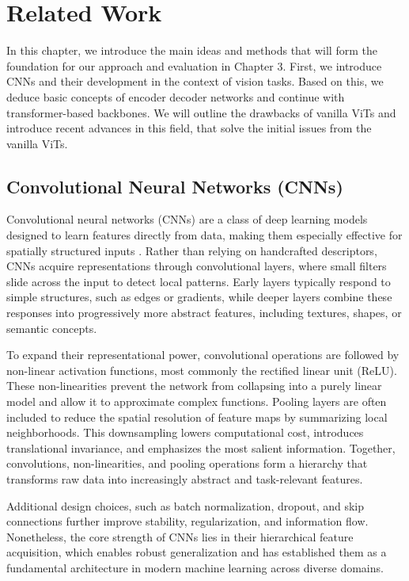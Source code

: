 \chapter{Related Work} 
\label{State of the art}

In this chapter, we introduce the main ideas and methods that will form the foundation for our approach and evaluation in Chapter 3.
First, we introduce CNNs and their development in the context of vision tasks. Based on this, we deduce basic concepts of encoder decoder networks and continue with transformer-based backbones. We will outline the drawbacks of vanilla ViTs and introduce recent advances in this field, that solve the initial issues from the vanilla ViTs. 


\section{Convolutional Neural Networks (CNNs)}

Convolutional neural networks (CNNs) are a class of deep learning models designed to learn features directly from data, making them especially effective for spatially structured inputs \cite{LeCun.1989}. Rather than relying on handcrafted descriptors, CNNs acquire representations through convolutional layers, where small filters slide across the input to detect local patterns. Early layers typically respond to simple structures, such as edges or gradients, while deeper layers combine these responses into progressively more abstract features, including textures, shapes, or semantic concepts.

To expand their representational power, convolutional operations are followed by non-linear activation functions, most commonly the rectified linear unit (ReLU). These non-linearities prevent the network from collapsing into a purely linear model and allow it to approximate complex functions. Pooling layers are often included to reduce the spatial resolution of feature maps by summarizing local neighborhoods. This downsampling lowers computational cost, introduces translational invariance, and emphasizes the most salient information. Together, convolutions, non-linearities, and pooling operations form a hierarchy that transforms raw data into increasingly abstract and task-relevant features.

Additional design choices, such as batch normalization, dropout, and skip connections further improve stability, regularization, and information flow. Nonetheless, the core strength of CNNs lies in their hierarchical feature acquisition, which enables robust generalization and has established them as a fundamental architecture in modern machine learning across diverse domains.

